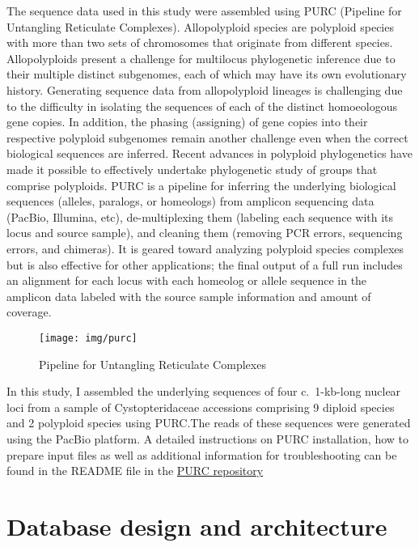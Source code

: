 \documentclass[
]{book}
\begin{document}
The sequence data used in this study were assembled using PURC (Pipeline for Untangling Reticulate Complexes). Allopolyploid species are polyploid species with more than two sets of chromosomes that originate from different species. Allopolyploids present a challenge for multilocus phylogenetic inference due to their multiple distinct subgenomes, each of which may have its own evolutionary history. Generating sequence data from allopolyploid lineages is challenging due to the difficulty in isolating the sequences of each of the distinct homoeologous gene copies. In addition, the phasing (assigning) of gene copies into their respective polyploid subgenomes remain another challenge even when the correct biological sequences are inferred. Recent advances in polyploid phylogenetics have made it possible to effectively undertake phylogenetic study of groups that comprise polyploids. PURC is a pipeline for inferring the underlying biological sequences (alleles, paralogs, or homeologs) from amplicon sequencing data (PacBio, Illumina, etc), de-multiplexing them (labeling each sequence with its locus and source sample), and cleaning them (removing PCR errors, sequencing errors, and chimeras). It is geared toward analyzing polyploid species complexes but is also effective for other applications; the final output of a full run includes an alignment for each locus with each homeolog or allele sequence in the amplicon data labeled with the source sample information and amount of coverage.

\begin{figure}

{\centering \texttt{[image: img/purc]} 

}

\caption{Pipeline for Untangling Reticulate Complexes}\label{fig:image3}
\end{figure}

In this study, I assembled the underlying sequences of four c.~1-kb-long nuclear loci from a sample of Cystopteridaceae accessions comprising 9 diploid species and 2 polyploid species using PURC.The reads of these sequences were generated using the PacBio platform.
A detailed instructions on PURC installation, how to prepare input files as well as additional information for troubleshooting can be found in the README file in the \href{https://bitbucket.org/peter_schafran/purc/}{PURC repository}

\hypertarget{database-design}{%
\chapter{Database design and architecture}\label{database-design}}
\end{document}
